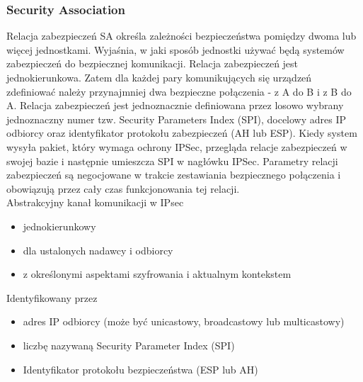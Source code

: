 \documentclass[main.tex]{subfiles}
\begin{document}
    \subsubsection{Security Association}
    Relacja zabezpieczeń SA określa zależności bezpieczeństwa pomiędzy dwoma lub więcej jednostkami. Wyjaśnia, w jaki sposób jednostki używać będą systemów zabezpieczeń do bezpiecznej komunikacji. Relacja zabezpieczeń jest jednokierunkowa. Zatem dla każdej pary komunikujących się urządzeń zdefiniować należy przynajmniej dwa bezpieczne połączenia - z A do B i z B do A. Relacja zabezpieczeń jest jednoznacznie definiowana przez losowo wybrany jednoznaczny numer tzw. Security Parameters Index (SPI), docelowy adres IP odbiorcy oraz identyfikator protokołu zabezpieczeń (AH lub ESP). Kiedy system wysyła pakiet, który wymaga ochrony IPSec, przegląda relacje zabezpieczeń w swojej bazie i następnie umieszcza SPI w nagłówku IPSec. Parametry relacji zabezpieczeń są negocjowane w trakcie zestawiania bezpiecznego połączenia i obowiązują przez cały czas funkcjonowania tej relacji.\\

    Abstrakcyjny kanał komunikacji w IPsec
    \begin{itemize}
        \item jednokierunkowy
        \item dla ustalonych nadawcy i odbiorcy
        \item z określonymi aspektami szyfrowania i aktualnym kontekstem
    \end{itemize}

    Identyfikowany przez
    \begin{itemize}
        \item adres IP odbiorcy (może być unicastowy, broadcastowy lub multicastowy)
        \item liczbę nazywaną Security Parameter Index (SPI)
        \item Identyfikator protokołu bezpieczeństwa (ESP lub AH)
    \end{itemize}
\end{document}
